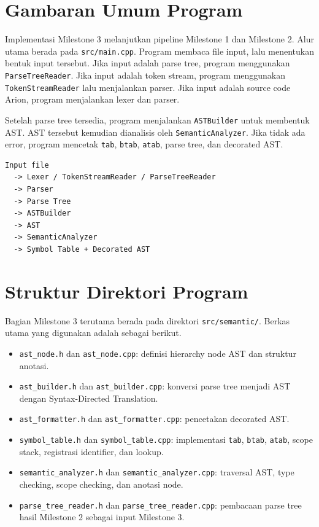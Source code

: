 \section{Gambaran Umum Program}
Implementasi Milestone 3 melanjutkan pipeline Milestone 1 dan Milestone 2. Alur utama berada pada \texttt{src/main.cpp}. Program membaca file input, lalu menentukan bentuk input tersebut. Jika input adalah parse tree, program menggunakan \texttt{ParseTreeReader}. Jika input adalah token stream, program menggunakan \texttt{TokenStreamReader} lalu menjalankan parser. Jika input adalah source code Arion, program menjalankan lexer dan parser.

Setelah parse tree tersedia, program menjalankan \texttt{ASTBuilder} untuk membentuk AST. AST tersebut kemudian dianalisis oleh \texttt{SemanticAnalyzer}. Jika tidak ada error, program mencetak \texttt{tab}, \texttt{btab}, \texttt{atab}, parse tree, dan decorated AST.

\begin{tcolorbox}[title=Pipeline Program,colback=gray!5,colframe=black!60,boxrule=0.5pt,arc=2mm]
    \begin{verbatim}
Input file
  -> Lexer / TokenStreamReader / ParseTreeReader
  -> Parser
  -> Parse Tree
  -> ASTBuilder
  -> AST
  -> SemanticAnalyzer
  -> Symbol Table + Decorated AST
\end{verbatim}
\end{tcolorbox}

\section{Struktur Direktori Program}
Bagian Milestone 3 terutama berada pada direktori \texttt{src/semantic/}. Berkas utama yang digunakan adalah sebagai berikut.

\begin{itemize}
    \item \texttt{ast\_node.h} dan \texttt{ast\_node.cpp}: definisi hierarchy node AST dan struktur anotasi.
    \item \texttt{ast\_builder.h} dan \texttt{ast\_builder.cpp}: konversi parse tree menjadi AST dengan Syntax-Directed Translation.
    \item \texttt{ast\_formatter.h} dan \texttt{ast\_formatter.cpp}: pencetakan decorated AST.
    \item \texttt{symbol\_table.h} dan \texttt{symbol\_table.cpp}: implementasi \texttt{tab}, \texttt{btab}, \texttt{atab}, scope stack, registrasi identifier, dan lookup.
    \item \texttt{semantic\_analyzer.h} dan \texttt{semantic\_analyzer.cpp}: traversal AST, type checking, scope checking, dan anotasi node.
    \item \texttt{parse\_tree\_reader.h} dan \texttt{parse\_tree\_reader.cpp}: pembacaan parse tree hasil Milestone 2 sebagai input Milestone 3.
\end{itemize}

